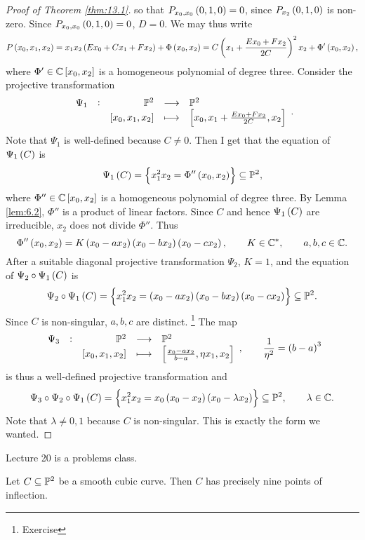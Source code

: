 \begin{proof}[Proof of Theorem \ref{thm:13.1}]
so that $ P_{x_0, x_0}\br{0, 1, 0} = 0 $, since $ P_{x_2}\br{0, 1, 0} $ is non-zero. Since $ P_{x_0, x_0}\br{0, 1, 0} = 0 $, $ D = 0 $. We may thus write
$$ P\br{x_0, x_1, x_2} = x_1x_2\br{Ex_0 + Cx_1 + Fx_2} + \Phi\br{x_0, x_2} = C\br{x_1 + \dfrac{Ex_0 + Fx_2}{2C}}^2x_2 + \Phi'\br{x_0, x_2}, $$
where $ \Phi' \in \CC\sbr{x_0, x_2} $ is a homogeneous polynomial of degree three. Consider the projective transformation
$$ \function[\Psi_1]{\PP^2}{\PP^2}{\sbr{x_0, x_1, x_2}}{\sbr{x_0, x_1 + \tfrac{Ex_0 + Fx_2}{2C}, x_2}}. $$
Note that $ \Psi_1 $ is well-defined because $ C \ne 0 $. Then I get that the equation of $ \Psi_1\br{C} $ is
$$ \Psi_1\br{C} = \cbr{x_1^2x_2 = \Phi''\br{x_0, x_2}} \subseteq \PP^2, $$
where $ \Phi'' \in \CC\sbr{x_0, x_2} $ is a homogeneous polynomial of degree three. By Lemma \ref{lem:6.2}, $ \Phi'' $ is a product of linear factors. Since $ C $ and hence $ \Psi_1\br{C} $ are irreducible, $ x_2 $ does not divide $ \Phi'' $. Thus
$$ \Phi''\br{x_0, x_2} = K\br{x_0 - ax_2}\br{x_0 - bx_2}\br{x_0 - cx_2}, \qquad K \in \CC^*, \qquad a, b, c \in \CC. $$
After a suitable diagonal projective transformation $ \Psi_2 $, $ K = 1 $, and the equation of $ \Psi_2 \circ \Psi_1\br{C} $ is
$$ \Psi_2 \circ \Psi_1\br{C} = \cbr{x_1^2x_2 = \br{x_0 - ax_2}\br{x_0 - bx_2}\br{x_0 - cx_2}} \subseteq \PP^2. $$
Since $ C $ is non-singular, $ a, b, c $ are distinct. \footnote{Exercise} The map
$$ \function[\Psi_3]{\PP^2}{\PP^2}{\sbr{x_0, x_1, x_2}}{\sbr{\tfrac{x_0 - ax_2}{b - a}, \eta x_1, x_2}}, \qquad \dfrac{1}{\eta^2} = \br{b - a}^3 $$
is thus a well-defined projective transformation and
$$ \Psi_3 \circ \Psi_2 \circ \Psi_1\br{C} = \cbr{x_1^2x_2 = x_0\br{x_0 - x_2}\br{x_0 - \lambda x_2}} \subseteq \PP^2, \qquad \lambda \in \CC. $$
Note that $ \lambda \ne 0, 1 $ because $ C $ is non-singular. This is exactly the form we wanted.
\end{proof}


Lecture 20 is a problems class.


\begin{corollary}
Let $ C \subseteq \mathbb{P}^2 $ be a smooth cubic curve. Then $ C $ has precisely nine points of inflection.
\end{corollary}

